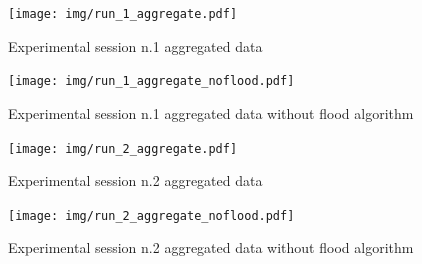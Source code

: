 \newpage
\begin{center}
\begin{figure}[h!]
        \centering
    		\texttt{[image: img/run\_1\_aggregate.pdf]}
    		\caption{Experimental session n.1 aggregated data}
    		\label{fig:run_1_aggregate}
\end{figure}
\begin{figure}[h!]
		\centering
    		\texttt{[image: img/run\_1\_aggregate\_noflood.pdf]}
    		\caption{Experimental session n.1 aggregated data without flood algorithm}
    		\label{fig:run_1_aggregate_noflood}
\end{figure}
\end{center}
\newpage
\begin{figure}[h!]
	\begin{center}
    \texttt{[image: img/run\_2\_aggregate.pdf]}
    \caption{Experimental session n.2 aggregated data}
    \label{fig:run_2_aggregate}
  \end{center}
\end{figure}

\begin{figure}[h!]
	\begin{center}
    \texttt{[image: img/run\_2\_aggregate\_noflood.pdf]}
    \caption{Experimental session n.2 aggregated data without flood algorithm}
    \label{fig:run_2_aggregate_noflood}
  \end{center}
\end{figure}
\newpage

